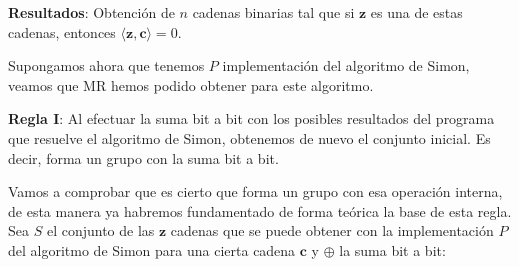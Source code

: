  \vspace{30pt}

 \textbf{Resultados}: Obtención de $n$ cadenas binarias tal que si $\mathbf{z}$ es una de estas cadenas, entonces $\langle \mathbf{z},\mathbf{c}\rangle = 0$.\newline

 Supongamos ahora que tenemos $P$ implementación del algoritmo de Simon, veamos que MR hemos podido obtener para este algoritmo.\newline

 \textbf{Regla I}: Al efectuar la suma bit a bit con los posibles resultados del programa que resuelve el algoritmo de Simon, obtenemos de nuevo el conjunto inicial. Es decir, forma un grupo con la suma bit a bit. \newline

 Vamos a comprobar que es cierto que forma un grupo con esa operación interna, de esta manera ya habremos fundamentado de forma teórica la base de esta regla. Sea $S$ el conjunto de las $\mathbf{z}$ cadenas que se puede obtener con la implementación $P$ del algoritmo de Simon para una cierta cadena $\mathbf{c}$ y $\oplus$ la suma bit a bit:

